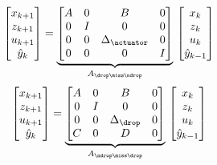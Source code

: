 \begin{equation}
    \begin{bmatrix}
        x_{k+1} \\
        z_{k+1} \\
        u_{k+1} \\
        \hat y_{k} \\
    \end{bmatrix} = \underbrace{\begin{bmatrix}
        A & 0 & B & 0 \\
        0 & I & 0 & 0 \\
        0 & 0 & \Delta_\actuator & 0 \\
        0 & 0 & 0 & I
    \end{bmatrix}}_{A_{\drop\miss\ndrop}}\, \begin{bmatrix}
        x_{k} \\
        z_{k} \\
        u_{k} \\
        \hat y_{k-1} \\
    \end{bmatrix}
\end{equation}
%
\begin{equation}
    \begin{bmatrix}
        x_{k+1} \\
        z_{k+1} \\
        u_{k+1} \\
        \hat y_{k} \\
    \end{bmatrix} = \underbrace{\begin{bmatrix}
        A & 0 & B & 0 \\
        0 & I & 0 & 0 \\
        0 & 0 & \Delta_\drop & 0 \\
        C & 0 & D & 0
    \end{bmatrix}}_{A_{\ndrop\miss\drop}}\, \begin{bmatrix}
        x_{k} \\
        z_{k} \\
        u_{k} \\
        \hat y_{k-1} \\
    \end{bmatrix}
\end{equation}
%
